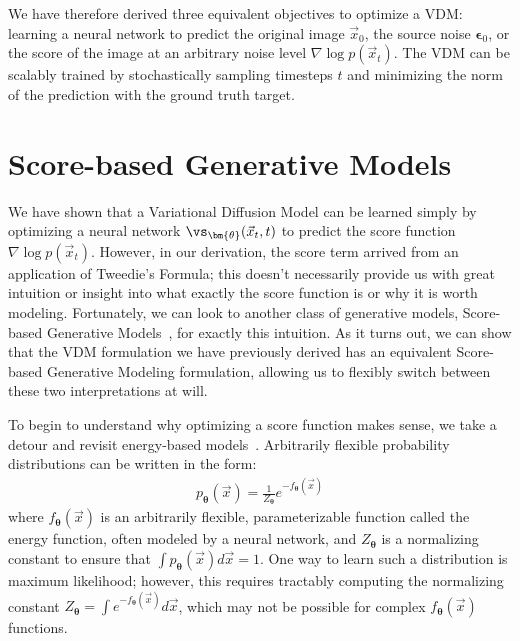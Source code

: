 We have therefore derived three equivalent objectives to optimize a VDM: learning a neural network to predict the original image $\vec{x}_0$, the source noise $\bm{\epsilon}_0$, or the score of the image at an arbitrary noise level $\nabla\log p(\vec{x}_t)$.  The VDM can be scalably trained by stochastically sampling timesteps $t$ and minimizing the norm of the prediction with the ground truth target.

\section*{Score-based Generative Models}
%
We have shown that a Variational Diffusion Model can be learned simply by optimizing a neural network $\vs_{\bm{\theta}}(\vec{x}_t, t)$ to predict the score function $\nabla\log p(\vec{x}_t)$.  However, in our derivation, the score term arrived from an application of Tweedie's Formula; this doesn't necessarily provide us with great intuition or insight into what exactly the score function is or why it is worth modeling.  Fortunately, we can look to another class of generative models, Score-based Generative Models~\cite{song2019generative, song2020score, song2020improved}, for exactly this intuition.  As it turns out, we can show that the VDM formulation we have previously derived has an equivalent Score-based Generative Modeling formulation, allowing us to flexibly switch between these two interpretations at will.

To begin to understand why optimizing a score function makes sense, we take a detour and revisit energy-based models~\cite{lecun2006tutorial, song2021train}.  Arbitrarily flexible probability distributions can be written in the form:
\begin{align}
    p_{\bm{\theta}}(\vec{x}) = \frac{1}{Z_{\bm{\theta}}}e^{-f_{\bm{\theta}}(\vec{x})} \label{eq:127}
\end{align}
where $f_{\bm{\theta}}(\vec{x})$ is an arbitrarily flexible, parameterizable function called the energy function, often modeled by a neural network, and $Z_{\bm{\theta}}$ is a normalizing constant to ensure that $\int p_{\bm{\theta}}(\vec{x})d\vec{x} = 1$.  One way to learn such a distribution is maximum likelihood; however, this requires tractably computing the normalizing constant $Z_{\bm{\theta}} = \int e^{-f_{\bm{\theta}}(\vec{x})}d\vec{x}$, which may not be possible for complex $f_{\bm{\theta}}(\vec{x})$ functions.

